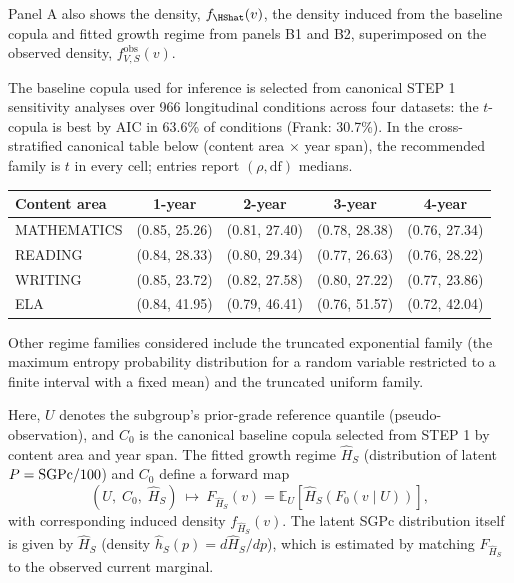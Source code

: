 \documentclass[10pt]{article}
\newlength{\fnlabelwidth}
\newcommand{\fnline}[2]{%
  \par\noindent
  \makebox[\fnlabelwidth][l]{$^{#1}$}%
  \parbox[t]{\dimexpr\linewidth-\fnlabelwidth\relax}{#2}%
  \par
}
\begin{document}
\vspace{0.60in}

\noindent
\hspace{0.5in}%
\begin{minipage}[t]{15.2in}
\small\raggedright
\setlength{\parskip}{0pt}

\fnline{1}{Panel A also shows the density, $f_{\HShat}(v)$, the density induced from the baseline copula and fitted growth regime from panels B1 and B2, superimposed on the observed density, $f^{\mathrm{obs}}_{V,S}(v)$.}

\vspace{4pt}
\fnline{2}{The baseline copula used for inference is selected from canonical STEP 1 sensitivity analyses over 966 longitudinal conditions across four datasets: the $t$-copula is best by AIC in 63.6\% of conditions (Frank: 30.7\%). In the cross-stratified canonical table below (content area $\times$ year span), the recommended family is $t$ in every cell; entries report $(\rho,\mathrm{df})$ medians.
\vspace{2pt}
\begin{center}
\begin{tabular}{@{}lcccc@{}}
\textbf{Content area} & \textbf{1-year} & \textbf{2-year} & \textbf{3-year} & \textbf{4-year} \\
\hline
\noalign{\vspace{2pt}}
MATHEMATICS & (0.85, 25.26) & (0.81, 27.40) & (0.78, 28.38) & (0.76, 27.34) \\
READING     & (0.84, 28.33) & (0.80, 29.34) & (0.77, 26.63) & (0.76, 28.22) \\
WRITING     & (0.85, 23.72) & (0.82, 27.58) & (0.80, 27.22) & (0.77, 23.86) \\
ELA         & (0.84, 41.95) & (0.79, 46.41) & (0.76, 51.57) & (0.72, 42.04) \\
\end{tabular}
\end{center}}

\vspace{6pt}
\fnline{3}{Other regime families considered include the truncated exponential family (the maximum entropy probability distribution for a random variable restricted to a finite interval with a fixed mean) and the truncated uniform family.}

\vspace{4pt}
\fnline{4}{Here, $U$ denotes the subgroup's prior-grade reference quantile (pseudo-observation), and $C_0$ is the canonical baseline copula selected from STEP 1 by content area and year span. The fitted growth regime $\widehat{H}_S$ (distribution of latent $P=\mathrm{SGPc}/100$) and $C_0$ define a forward map
\[
(U,\;C_0,\;\widehat{H}_S)\ \longmapsto\ F_{\widehat{H}_S}(v)=\mathbb{E}_U\!\left[\widehat{H}_S\!\left(F_0(v\mid U)\right)\right],
\]
with corresponding induced density $f_{\widehat{H}_S}(v)$. The latent SGPc distribution itself is given by $\widehat{H}_S$ (density $\widehat{h}_S(p)=d\widehat{H}_S/dp$), which is estimated by matching $F_{\widehat{H}_S}$ to the observed current marginal.}


\end{minipage}
\end{document}
